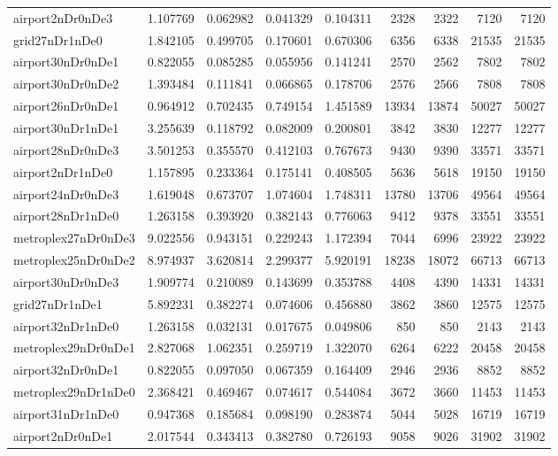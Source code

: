 \begin{longtable}{|l|r|r|r|r|r|r|r|r|}
airport2nDr0nDe3 & 1.107769 & 0.062982 & 0.041329 & 0.104311 & 2328 & 2322 & 7120 & 7120 \\
grid27nDr1nDe0 & 1.842105 & 0.499705 & 0.170601 & 0.670306 & 6356 & 6338 & 21535 & 21535 \\
airport30nDr0nDe1 & 0.822055 & 0.085285 & 0.055956 & 0.141241 & 2570 & 2562 & 7802 & 7802 \\
airport30nDr0nDe2 & 1.393484 & 0.111841 & 0.066865 & 0.178706 & 2576 & 2566 & 7808 & 7808 \\
airport26nDr0nDe1 & 0.964912 & 0.702435 & 0.749154 & 1.451589 & 13934 & 13874 & 50027 & 50027 \\
airport30nDr1nDe1 & 3.255639 & 0.118792 & 0.082009 & 0.200801 & 3842 & 3830 & 12277 & 12277 \\
airport28nDr0nDe3 & 3.501253 & 0.355570 & 0.412103 & 0.767673 & 9430 & 9390 & 33571 & 33571 \\
airport2nDr1nDe0 & 1.157895 & 0.233364 & 0.175141 & 0.408505 & 5636 & 5618 & 19150 & 19150 \\
airport24nDr0nDe3 & 1.619048 & 0.673707 & 1.074604 & 1.748311 & 13780 & 13706 & 49564 & 49564 \\
airport28nDr1nDe0 & 1.263158 & 0.393920 & 0.382143 & 0.776063 & 9412 & 9378 & 33551 & 33551 \\
metroplex27nDr0nDe3 & 9.022556 & 0.943151 & 0.229243 & 1.172394 & 7044 & 6996 & 23922 & 23922 \\
metroplex25nDr0nDe2 & 8.974937 & 3.620814 & 2.299377 & 5.920191 & 18238 & 18072 & 66713 & 66713 \\
airport30nDr0nDe3 & 1.909774 & 0.210089 & 0.143699 & 0.353788 & 4408 & 4390 & 14331 & 14331 \\
grid27nDr1nDe1 & 5.892231 & 0.382274 & 0.074606 & 0.456880 & 3862 & 3860 & 12575 & 12575 \\
airport32nDr1nDe0 & 1.263158 & 0.032131 & 0.017675 & 0.049806 & 850 & 850 & 2143 & 2143 \\
metroplex29nDr0nDe1 & 2.827068 & 1.062351 & 0.259719 & 1.322070 & 6264 & 6222 & 20458 & 20458 \\
airport32nDr0nDe1 & 0.822055 & 0.097050 & 0.067359 & 0.164409 & 2946 & 2936 & 8852 & 8852 \\
metroplex29nDr1nDe0 & 2.368421 & 0.469467 & 0.074617 & 0.544084 & 3672 & 3660 & 11453 & 11453 \\
airport31nDr1nDe0 & 0.947368 & 0.185684 & 0.098190 & 0.283874 & 5044 & 5028 & 16719 & 16719 \\
airport2nDr0nDe1 & 2.017544 & 0.343413 & 0.382780 & 0.726193 & 9058 & 9026 & 31902 & 31902 \\

\end{longtable}
